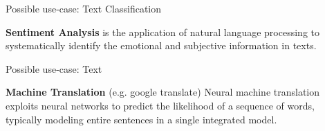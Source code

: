 \begin{frame} {Possible use-case: Text Classification}
\vspace{1cm}
\begin{figure}
\centering
{}
\end{figure}

\vspace{.5cm}

\textbf{Sentiment Analysis} is the application of natural language processing to systematically identify the emotional and subjective information in texts.

\end{frame}

\begin{frame} {Possible use-case: Text}
\begin{figure}
\centering
{}
\end{figure}
\textbf{Machine Translation} (e.g. google translate) 
Neural machine translation exploits neural networks to predict the likelihood of a sequence of words, typically modeling entire sentences in a single integrated model.
\end{frame}

